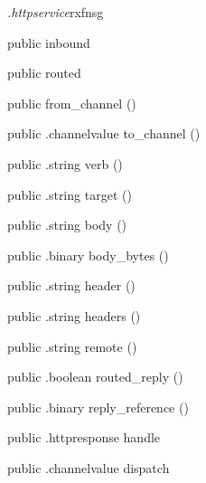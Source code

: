 \begin{CrexxClass}{\textit{.httpservice}}{rxfnsg}

  \begin{Hierarchy}
  \end{Hierarchy}

  \begin{Members}

    \Factory
      {public}
      {inbound}
      {}

    \Factory
      {public}
      {routed}
      {}

    \Factory
      {public}
      {from\_channel}
      {()}

    \Method
      {public}
      {.channelvalue}
      {to\_channel}
      {()}

    \Method
      {public}
      {.string}
      {verb}
      {()}

    \Method
      {public}
      {.string}
      {target}
      {()}

    \Method
      {public}
      {.string}
      {body}
      {()}

    \Method
      {public}
      {.binary}
      {body\_bytes}
      {()}

    \Method
      {public}
      {.string}
      {header}
      {()}

    \Method
      {public}
      {.string}
      {headers}
      {()}

    \Method
      {public}
      {.string}
      {remote}
      {()}

    \Method
      {public}
      {.boolean}
      {routed\_reply}
      {()}

    \Method
      {public}
      {.binary}
      {reply\_reference}
      {()}

    \Method
      {public}
      {.httpresponse}
      {handle}
      {}

    \Method
      {public}
      {.channelvalue}
      {dispatch}
      {}

  \end{Members}
\end{CrexxClass}

